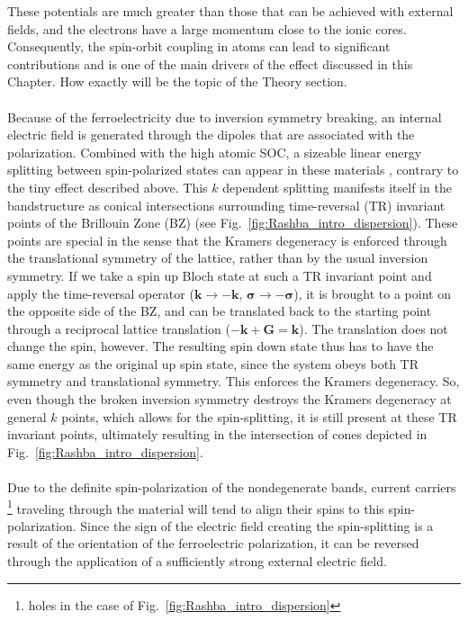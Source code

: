 These potentials are much greater than those that can be achieved with external fields, and the electrons have a large momentum close to the ionic cores.
Consequently, the spin-orbit coupling in atoms can lead to significant contributions and is one of the main drivers of the effect discussed in this Chapter.
How exactly will be the topic of the Theory section.
\\\\
Because of the ferroelectricity due to inversion symmetry breaking, an internal electric field is generated through the dipoles that are associated with the polarization.
Combined with the high atomic SOC, a sizeable linear energy splitting between spin-polarized states can appear in these materials \cite{DiSante2013}, contrary to the tiny effect described above.
This $k$ dependent splitting manifests itself in the bandstructure as conical intersections surrounding time-reversal (TR) invariant points of the Brillouin Zone (BZ) (see Fig.~\ref{fig:Rashba_intro_dispersion}).
These points are special in the sense that the Kramers degeneracy \cite{Kramerstheorem} is enforced through the translational symmetry of the lattice, rather than by the usual inversion symmetry.
If we take a spin up Bloch state at such a TR invariant point and apply the time-reversal operator ($\bm k \rightarrow \bm {-k}$, $\bm{\sigma} \rightarrow -\bm{\sigma}$), it is brought to a point on the opposite side of the BZ, and can be translated back to the starting point through a reciprocal lattice translation ($-\bm k + \bm G = \bm k$). The translation does not change the spin, however.
The resulting spin down state thus has to have the same energy as the original up spin state, since the system obeys both TR symmetry and translational symmetry.
This enforces the Kramers degeneracy.
So, even though the broken inversion symmetry destroys the Kramers degeneracy at general $k$ points, which allows for the spin-splitting, it is still present at these TR invariant points, ultimately resulting in the intersection of cones depicted in Fig.~\ref{fig:Rashba_intro_dispersion}.
\\\\
Due to the definite spin-polarization of the nondegenerate bands, current carriers \footnote{holes in the case of Fig.~\ref{fig:Rashba_intro_dispersion}} traveling through the material will tend to align their spins to this spin-polarization.
Since the sign of the electric field creating the spin-splitting is a result of the orientation of the ferroelectric polarization, it can be reversed through the application of a sufficiently strong external electric field.
